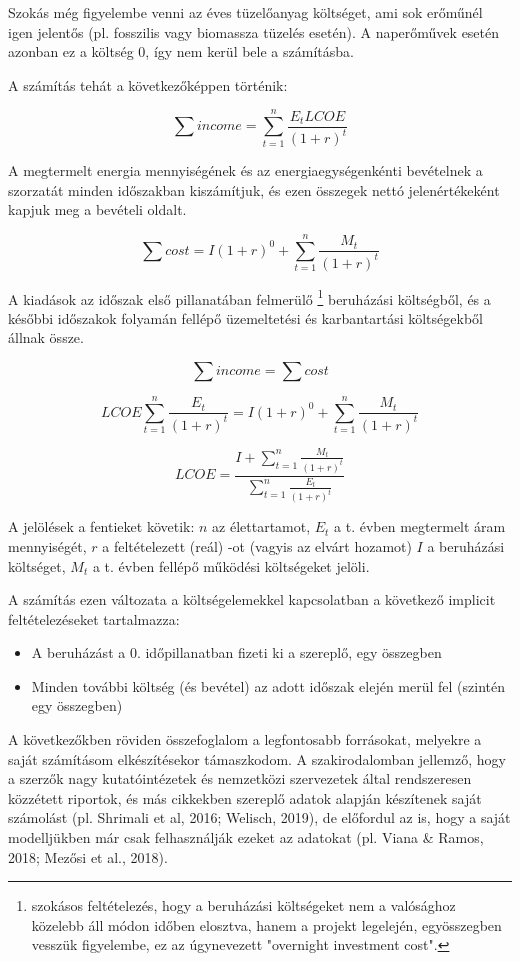 \documentclass[twoside, magyar, showtrims]{corvinusphd}
\begin{document}
Szokás még figyelembe venni az éves tüzelőanyag költséget,
ami sok erőműnél igen jelentős (pl. fosszilis vagy biomassza tüzelés esetén).
A naperőművek esetén azonban ez a költség 0,
így nem kerül bele a számításba.

A számítás tehát a következőképpen történik:

\[
        \sum income = \sum_{t=1}^n\frac{E_t LCOE}{(1+r)^t}
\]

A megtermelt energia mennyiségének és 
az energiaegységenkénti bevételnek a
szorzatát minden időszakban kiszámítjuk,
és ezen összegek nettó jelenértékeként
kapjuk meg a bevételi oldalt.

\[
        \sum cost = I (1+r)^0 + \sum_{t=1}^n\frac{M_t}{(1+r)^t}
\]

A kiadások az időszak első pillanatában felmerülő
\footnote{szokásos feltételezés, hogy a beruházási költségeket
nem a valósághoz közelebb áll módon időben elosztva,
hanem a projekt legelején, egyösszegben vesszük
figyelembe, ez az úgynevezett "overnight investment cost".}
beruházási költségből, és a későbbi időszakok folyamán
fellépő üzemeltetési és karbantartási költségekből állnak össze.

\[
        \sum income = \sum cost
\]

\[
LCOE \sum_{t=1}^n\frac{E_t}{(1+r)^t} =  I (1+r)^0 + \sum_{t=1}^n\frac{M_t}{(1+r)^t}
\]

\[
LCOE = \frac{ I + \sum_{t=1}^n\frac{M_t}{(1+r)^t}}{\sum_{t=1}^n\frac{E_t}{(1+r)^t} }
\]


A jelölések a fentieket követik: $n$ az élettartamot,
$E_t$ a t. évben megtermelt áram mennyiségét,
$r$ a feltételezett (reál) -ot (vagyis az elvárt hozamot)
$I$ a beruházási költséget, $M_t$ a t. évben fellépő működési költségeket jelöli.

A számítás ezen változata a költségelemekkel kapcsolatban
a következő implicit feltételezéseket tartalmazza:
\begin{itemize}
    \item 
    A beruházást a 0. időpillanatban fizeti ki a szereplő,
egy összegben
    \item
    Minden további költség (és bevétel) az adott időszak elején merül fel (szintén egy összegben)
\end{itemize}

A következőkben röviden összefoglalom a legfontosabb forrásokat,
melyekre a saját  számításom elkészítésekor támaszkodom.
A szakirodalomban jellemző, hogy a szerzők nagy kutatóintézetek
és nemzetközi szervezetek által rendszeresen közzétett riportok,
és más cikkekben szereplő adatok alapján készítenek
saját számolást (pl. Shrimali et al, 2016; Welisch, 2019),
de előfordul az is, hogy a saját modelljükben
már csak felhasználják ezeket az adatokat
(pl. Viana \& Ramos, 2018; Mezősi et al., 2018).
\end{document}
